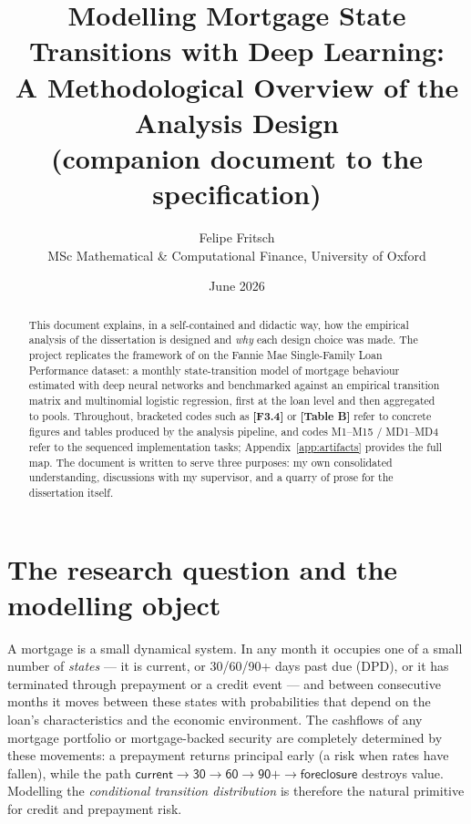 \documentclass[11pt,a4paper]{article}
\title{Modelling Mortgage State Transitions with Deep Learning:\\
\large A Methodological Overview of the Analysis Design\\
\normalsize (companion document to the \code{specs/model} specification)}
\author{Felipe Fritsch\\ \small MSc Mathematical \& Computational Finance, University of Oxford}
\date{June 2026}
\newcommand{\state}[1]{\textsf{#1}}
\newcommand{\artifact}[1]{\textbf{[#1]}}
\begin{document}
\maketitle

\begin{abstract}
\noindent This document explains, in a self-contained and didactic way, how the empirical analysis of the dissertation is designed and \emph{why} each design choice was made. The project replicates the framework of \citet{sirignano2021} on the Fannie Mae Single-Family Loan Performance dataset: a monthly state-transition model of mortgage behaviour estimated with deep neural networks and benchmarked against an empirical transition matrix and multinomial logistic regression, first at the loan level and then aggregated to pools. Throughout, bracketed codes such as \artifact{F3.4} or \artifact{Table B} refer to concrete figures and tables produced by the analysis pipeline, and codes M1--M15 / MD1--MD4 refer to the sequenced implementation tasks; Appendix~\ref{app:artifacts} provides the full map. The document is written to serve three purposes: my own consolidated understanding, discussions with my supervisor, and a quarry of prose for the dissertation itself.
\end{abstract}

\tableofcontents

\section{The research question and the modelling object}\label{sec:object}

A mortgage is a small dynamical system. In any month it occupies one of a small number of \emph{states} --- it is current, or 30/60/90+ days past due (DPD), or it has terminated through prepayment or a credit event --- and between consecutive months it moves between these states with probabilities that depend on the loan's characteristics and the economic environment. The cashflows of any mortgage portfolio or mortgage-backed security are completely determined by these movements: a prepayment returns principal early (a risk when rates have fallen), while the path $\state{current}\to\state{30}\to\state{60}\to\state{90+}\to\state{foreclosure}$ destroys value. Modelling the \emph{conditional transition distribution} is therefore the natural primitive for credit and prepayment risk.
\end{document}
